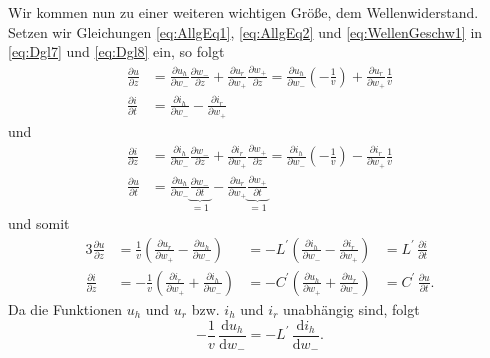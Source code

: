 \documentclass[paper=a4, parskip=half-, ngerman, fontsize=11pt]{scrreprt}
\begin{document}
Wir kommen nun zu einer weiteren wichtigen Größe, dem Wellenwiderstand.
Setzen wir Gleichungen \eqref{eq:AllgEq1}, \eqref{eq:AllgEq2} und \eqref{eq:WellenGeschw1} in \eqref{eq:Dgl7} und
\eqref{eq:Dgl8} ein, so folgt
\begin{align*}
    \frac{\partial u}{\partial z} &= \frac{\partial u_{h}}{\partial w_{-}} \frac{\partial w_{-}}{\partial z}
    + \frac{\partial u_{r}}{\partial w_{+}} \frac{\partial w_{+}}{\partial z}
    =
    \frac{\partial u_{h}}{\partial w_{-}} \left(- \frac{1}{v} \right) + \frac{\partial u_{r}}{\partial w_{+}}
    \frac{1}{v} \\[1ex]
    \frac{\partial i}{\partial t} &= \frac{\partial i_{h}}{\partial w_{-}} - \frac{\partial i_{r}}{\partial w_{+}}
\end{align*}
und
\begin{align*}
    \frac{\partial i}{\partial z} &= \frac{\partial i_{h}}{\partial w_{-}} \frac{\partial w_{-}}{\partial z}
    + \frac{\partial i_{r}}{\partial w_{+}} \frac{\partial w_{+}}{\partial z}
    =
    \frac{\partial i_{h}}{\partial w_{-}} \left(- \frac{1}{v} \right) - \frac{\partial i_{r}}{\partial w_{+}}
    \frac{1}{v} \\[1ex]
    \frac{\partial u}{\partial t} &= \frac{\partial u_{h}}{\partial w_{-}}
    \underbrace{\frac{\partial w_{-}}{\partial t} }_{=1}
    -
    \frac{\partial u_{r}}{\partial w_{+}} \underbrace{\frac{\partial w_{+}}{\partial t} }_{=1}
\end{align*}
und somit
\begin{alignat*}{3}
    \frac{\partial u}{\partial z} &= \frac{1}{v} \left( \frac{\partial u_{r}}{\partial w_{+}} -
    \frac{\partial u_{h}}{\partial w_{-}} \right) &= - L^{\prime} \left( \frac{\partial i_{h}}{\partial w_{-}} -
    \frac{\partial i_{r}}{\partial w_{+}} \right) &= L^{\prime} \, \frac{\partial i}{\partial t} \\[1ex]
    \frac{\partial i}{\partial z} &= - \frac{1}{v} \left( \frac{\partial i_{r}}{\partial w_{+}} +
    \frac{\partial i_{h}}{\partial w_{-}} \right) &= - C^{\prime} \left( \frac{\partial u_{h}}{\partial w_{+}} +
    \frac{\partial u_{r}}{\partial w_{-}} \right) &= C^{\prime} \, \frac{\partial u}{\partial t}.
\end{alignat*}
Da die Funktionen $u_{h}$ und $u_{r}$ bzw. $i_{h}$ und $i_{r}$ unabhängig sind, folgt
\begin{equation}
    - \frac{1}{v} \, \frac{\text{d} u_{h}}{\text{d} w_{-}} = - L^{\prime} \, \frac{\text{d} i_{h}}{\text{d} w_{-}}.
\end{equation}
\end{document}
